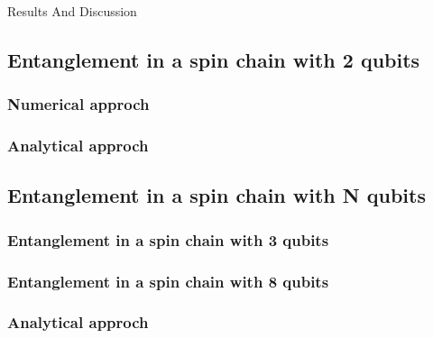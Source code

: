 Results And Discussion


\subsection{Entanglement in a spin chain with 2 qubits}

\subsubsection{Numerical approch}


\subsubsection{Analytical approch}


\subsection{Entanglement in a spin chain with N qubits}

\subsubsection{Entanglement in a spin chain with 3 qubits}


\subsubsection{Entanglement in a spin chain with 8 qubits}

\subsubsection{Analytical approch}
